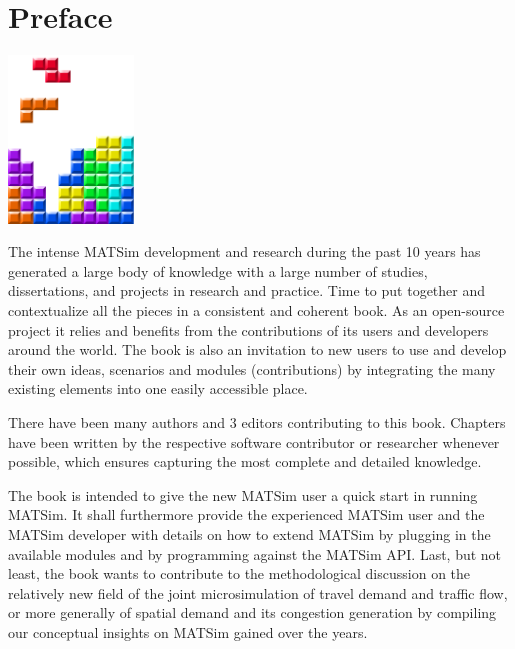 \chapter*{Preface}

\begin{center} \includegraphics[width=0.25\textwidth, angle=0]{figures/MATSimBook.png} \end{center}


The intense MATSim development and research during the past 10 years has generated a large body of knowledge with a large number of studies, dissertations, and projects in research and practice. Time to put together and contextualize all the pieces in a consistent and coherent book. As an open-source project it relies and benefits from the contributions of its users and developers around the world. The book is also an invitation to new users to use and develop their own ideas, scenarios and modules (contributions) by integrating the many existing elements into one easily accessible place.

There have been many authors and 3 editors contributing to this book. Chapters have been written by the respective software contributor or researcher whenever possible, which ensures capturing the most complete and detailed knowledge. 

The book is intended to give the new MATSim user a quick start in running MATSim. It shall furthermore provide the experienced MATSim user and the MATSim developer with details on how to extend MATSim by plugging in the available modules and by programming against the MATSim API. Last, but not least, the book wants to contribute to the methodological discussion on the relatively new field of the joint microsimulation of travel demand and traffic flow, or more generally of spatial demand and its congestion generation by compiling our conceptual insights on MATSim gained over the years.

